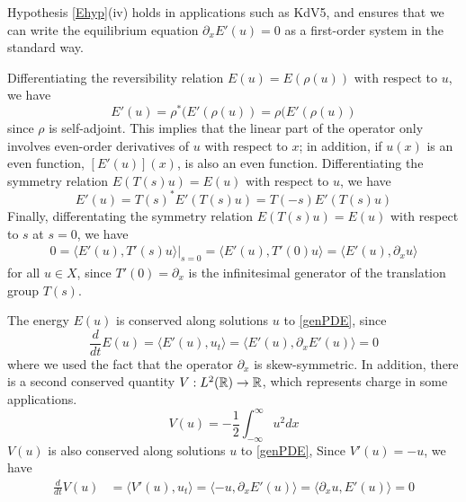 \documentclass[thesis.tex]{subfiles}
\begin{document}
Hypothesis \ref{Ehyp}(iv) holds in applications such as KdV5, and ensures that we can write the equilibrium equation $\partial_x E'(u) = 0$ as a first-order system in the standard way.

Differentiating the reversibility relation $E(u) = E(\rho(u))$ with respect to $u$, we have
\[
E'(u) = \rho^*( E'(\rho(u) ) = \rho( E'(\rho(u) )
\]
since $\rho$ is self-adjoint. This implies that the linear part of the operator only involves even-order derivatives of $u$ with respect to $x$; in addition, if $u(x)$ is an even function, $[E'(u)](x)$, is also an even function. Differentiating the symmetry relation $E(T(s)u) = E(u)$ with respect to $u$, we have
\begin{equation}\label{Eprimesymm}
E'(u) = T(s)^* E'(T(s)u) = T(-s) E'(T(s)u)
\end{equation}
Finally, differentating the symmetry relation $E(T(s)u) = E(u)$ with respect to $s$ at $s = 0$, we have
\begin{align*}
0 = \langle E'(u), T'(s) u \rangle|_{s = 0}
= \langle E'(u), T'(0) u \rangle
= \langle E'(u), \partial_x u \rangle
\end{align*}
for all $u \in X$, since $T'(0) = \partial_x$ is the infinitesimal generator of the translation group $T(s)$.

The energy $E(u)$ is conserved along solutions $u$ to \eqref{genPDE}, since
\[
\frac{d}{dt}E(u) = \langle E'(u), u_t \rangle = \langle E'(u), \partial_x E'(u) \rangle = 0
\]
where we used the fact that the operator $\partial_x$ is skew-symmetric. In addition, there is a second conserved quantity $V: L^2({\mathbb R}) \rightarrow {\mathbb R}$, which represents charge in some applications.
\begin{equation}\label{defV}
V(u) = -\frac{1}{2} \int_{-\infty}^\infty u^2 dx 
\end{equation}
$V(u)$ is also conserved along solutions $u$ to \eqref{genPDE}, Since $V'(u) = -u$, we have
\begin{align*}
\frac{d}{dt}V(u) &= \langle V'(u), u_t \rangle
= \langle -u, \partial_x E'(u) \rangle 
= \langle \partial_x u, E'(u) \rangle = 0
\end{align*}
\end{document}
